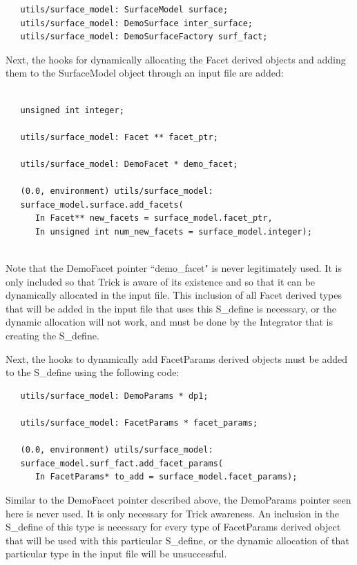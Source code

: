 \begin{verbatim}
   utils/surface_model: SurfaceModel surface;
   utils/surface_model: DemoSurface inter_surface;
   utils/surface_model: DemoSurfaceFactory surf_fact;
\end{verbatim}

Next, the hooks for dynamically allocating the Facet derived objects
and adding them to the SurfaceModel object through an input file are
added:

\begin{verbatim}  

   unsigned int integer;

   utils/surface_model: Facet ** facet_ptr;

   utils/surface_model: DemoFacet * demo_facet;

   (0.0, environment) utils/surface_model:
   surface_model.surface.add_facets(
      In Facet** new_facets = surface_model.facet_ptr,
      In unsigned int num_new_facets = surface_model.integer);
    
\end{verbatim}

Note that the DemoFacet pointer ``demo\_facet" is never legitimately
used. It is only included so that Trick is aware of its existence
and so that it can be dynamically allocated in the input file.
This inclusion of all Facet derived types that will be added
in the input file that uses this S\_define is necessary, or the
dynamic allocation will not work, and must be done by the Integrator
that is creating the S\_define.

Next, the hooks to dynamically add FacetParams derived objects
must be added to the S\_define using the following code:

\begin{verbatim}
   utils/surface_model: DemoParams * dp1;

   utils/surface_model: FacetParams * facet_params;

   (0.0, environment) utils/surface_model:
   surface_model.surf_fact.add_facet_params(
      In FacetParams* to_add = surface_model.facet_params);
\end{verbatim}

Similar to the DemoFacet pointer described above, the DemoParams
pointer seen here is never used. It is only necessary for Trick
awareness. An inclusion in the S\_define of this type is
necessary for every type of FacetParams derived object that will be
used with this particular S\_define, or the dynamic allocation of that
particular type in the input file will be unsuccessful.

